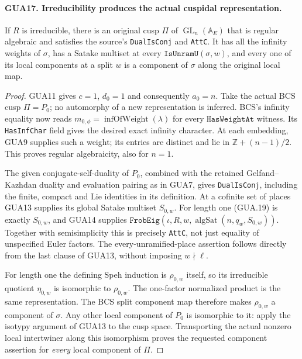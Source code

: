 \paragraph{GUA17. Irreducibility produces the actual cuspidal representation.}
\label{claim:GUA17}
If $R$ is irreducible, there is an original cusp
$\Pi$ of $\operatorname{GL}_n(\mathbb A_E)$ that is
regular algebraic and satisfies the source's
\texttt{DualIsConj} and \texttt{AttC}.  It has
all the infinity weights of $\sigma$, has a
Satake multiset at every
$\texttt{IsUnramU}(\sigma,w)$, and every one of
its local components at a split $w$ is a component
of $\sigma$ along the original local map.
\begin{proof}
GUA11 gives $c=1$, $d_0=1$ and consequently $a_0=n$.
Take the actual BCS cusp $\Pi=P_0$; no automorphy
of a new representation is inferred.  BCS's
infinity equality now reads
$m_{0,\phi}=\operatorname{infOfWeight}(\lambda)$
for every $\texttt{HasWeightAt}$ witness.  Its
\texttt{HasInfChar} field gives the desired exact
infinity character.  At each embedding, GUA9
supplies such a weight; its entries are distinct
and lie in $\mathbb Z+(n-1)/2$.  This proves
regular algebraicity, also for $n=1$.

The given conjugate-self-duality of $P_0$, combined
with the retained Gelfand--Kazhdan duality and
evaluation pairing as in GUA7, gives
\texttt{DualIsConj}, including the finite, compact
and Lie identities in its definition.  At a
cofinite set of places GUA13 supplies its global
Satake multiset $S_{0,w}$.  For length one (GUA.19)
is exactly $S_{0,w}$, and GUA14 supplies
$\texttt{FrobEig}(\iota,R,w,
\operatorname{algSat}(n,q_w,S_{0,w}))$.
Together with semisimplicity this is precisely
\texttt{AttC}, not just equality of unspecified
Euler factors.  The every-unramified-place
assertion follows directly from the last clause
of GUA13, without imposing $w\nmid\ell$.

For length one the defining Speh induction is
$\rho_{0,w}$ itself, so its irreducible quotient
$\eta_{0,w}$ is isomorphic to $\rho_{0,w}$.
The one-factor normalized product is the same
representation.  The BCS split component map
therefore makes $\rho_{0,w}$ a component of
$\sigma$.  Any other local component of $P_0$
is isomorphic to it: apply the isotypy argument
of GUA13 to the cusp space.  Transporting the
actual nonzero local intertwiner along this
isomorphism proves the requested component
assertion for \emph{every} local component of $\Pi$.
\end{proof}

